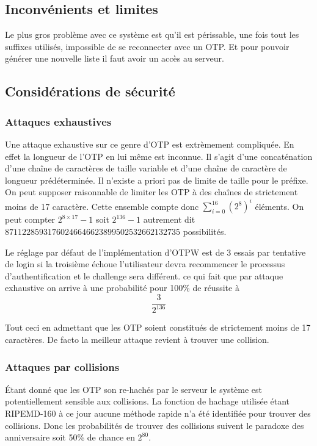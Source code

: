 \documentclass{../res/univ-projet}
\begin{document}
\subsection{Inconvénients et limites}
        Le plus gros problème avec ce système est qu'il est périssable, une fois tout les
    suffixes utilisés, impossible de se reconnecter avec un OTP. Et pour pouvoir générer
    une nouvelle liste il faut avoir un accès au serveur.

\subsection{Considérations de sécurité}
\subsubsection{Attaques exhaustives} %
        Une attaque exhaustive sur ce genre d'OTP est extrèmement compliquée.
    En effet la longueur de l'OTP en lui même est inconnue. Il s'agit d'une
    concaténation d'une chaîne de caractères de taille variable et d'une chaîne
    de caractère de longueur prédéterminée. Il n'existe a priori pas de limite
    de taille pour le préfixe. On peut supposer raisonnable de limiter les
    OTP à des chaînes de strictement moins de 17 caractère.
    Cette ensemble compte donc $\sum_{i=0}^{16}(2^8)^i$ éléments.
    On peut compter  $2^{8\times 17} - 1$ soit $2^136 -1$ autrement dit
    $87112285931760246646623899502532662132735$ possibilités.

        Le réglage par défaut de l'implémentation d'OTPW est de 3 essais par tentative de login
    si la troisième échoue l'utilisateur devra recommencer le processus d'authentification
    et le challenge sera différent. ce qui fait que par attaque exhaustive on arrive à
    une probabilité pour 100\% de réussite à
    \[\frac{3}{2^{136}}\]

        Tout ceci en admettant que les OTP soient constitués de strictement moins
    de 17 caractères. De facto la meilleur attaque revient à trouver une collision.

\subsubsection{Attaques par collisions}
        Étant donné que les OTP son re-hachés par le serveur le système est potentiellement sensible
    aux collisions. La fonction de hachage utilisée étant RIPEMD-160 à ce jour aucune méthode rapide
    n'a été identifiée pour trouver des collisions. Donc les probabilités de trouver des collisions
    suivent le paradoxe des anniversaire soit 50\% de chance en $2^80$.
\end{document}
